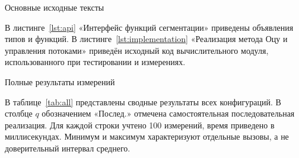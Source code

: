 \begin{center}Основные исходные тексты\end{center}
\renewcommand{\thelstlisting}{А.\arabic{lstlisting}}
\setcounter{lstlisting}{0}
В листинге~\ref{lst:api} «Интерфейс функций сегментации» приведены объявления типов и функций. В листинге~\ref{lst:implementation} «Реализация метода Оцу и управления потоками» приведён исходный код вычислительного модуля, использованного при тестировании и измерениях.

\clearpage


\begin{center}Полные результаты измерений\end{center}
\renewcommand{\thetable}{Б.\arabic{table}}\setcounter{table}{0}
В таблице~\ref{tab:all} представлены сводные результаты всех конфигураций. В столбце $q$ обозначением «Послед.» отмечена самостоятельная последовательная реализация. Для каждой строки учтено 100 измерений, время приведено в миллисекундах. Минимум и максимум характеризуют отдельные вызовы, а не доверительный интервал среднего.

